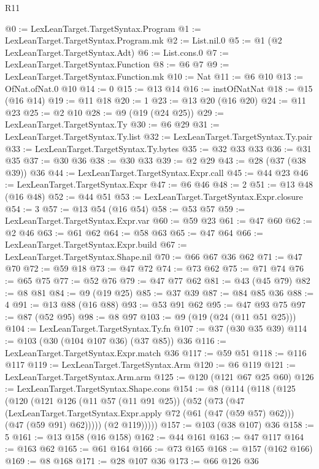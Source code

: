 \begin{lexlean}{R11}
\begin{coremodule}
@0 := LexLeanTarget.TargetSyntax.Program
@1 := LexLeanTarget.TargetSyntax.Program.mk
@2 := List.nil.{0}
@5 := @1 (@2 LexLeanTarget.TargetSyntax.Adt)
@6 := List.cons.{0}
@7 := LexLeanTarget.TargetSyntax.Function
@8 := @6 @7
@9 := LexLeanTarget.TargetSyntax.Function.mk
@10 := Nat
@11 := @6 @10
@13 := OfNat.ofNat.{0} @10
@14 := 0
@15 := @13 @14
@16 := instOfNatNat
@18 := @15 (@16 @14)
@19 := @11 @18
@20 := 1
@23 := @13 @20 (@16 @20)
@24 := @11 @23
@25 := @2 @10
@28 := @9 (@19 (@24 @25))
@29 := LexLeanTarget.TargetSyntax.Ty
@30 := @6 @29
@31 := LexLeanTarget.TargetSyntax.Ty.list
@32 := LexLeanTarget.TargetSyntax.Ty.pair
@33 := LexLeanTarget.TargetSyntax.Ty.bytes
@35 := @32 @33 @33
@36 := @31 @35
@37 := @30 @36
@38 := @30 @33
@39 := @2 @29
@43 := @28 (@37 (@38 @39)) @36
@44 := LexLeanTarget.TargetSyntax.Expr.call
@45 := @44 @23
@46 := LexLeanTarget.TargetSyntax.Expr
@47 := @6 @46
@48 := 2
@51 := @13 @48 (@16 @48)
@52 := @44 @51
@53 := LexLeanTarget.TargetSyntax.Expr.closure
@54 := 3
@57 := @13 @54 (@16 @54)
@58 := @53 @57
@59 := LexLeanTarget.TargetSyntax.Expr.var
@60 := @59 @23
@61 := @47 @60
@62 := @2 @46
@63 := @61 @62
@64 := @58 @63
@65 := @47 @64
@66 := LexLeanTarget.TargetSyntax.Expr.build
@67 := LexLeanTarget.TargetSyntax.Shape.nil
@70 := @66 @67 @36 @62
@71 := @47 @70
@72 := @59 @18
@73 := @47 @72
@74 := @73 @62
@75 := @71 @74
@76 := @65 @75
@77 := @52 @76
@79 := @47 @77 @62
@81 := @43 (@45 @79)
@82 := @8 @81
@84 := @9 (@19 @25)
@85 := @37 @39
@87 := @84 @85 @36
@88 := 4
@91 := @13 @88 (@16 @88)
@93 := @53 @91 @62
@95 := @47 @93 @75
@97 := @87 (@52 @95)
@98 := @8 @97
@103 := @9 (@19 (@24 (@11 @51 @25)))
@104 := LexLeanTarget.TargetSyntax.Ty.fn
@107 := @37 (@30 @35 @39)
@114 := @103 (@30 (@104 @107 @36) (@37 @85)) @36
@116 := LexLeanTarget.TargetSyntax.Expr.match @36
@117 := @59 @51
@118 := @116 @117
@119 := LexLeanTarget.TargetSyntax.Arm
@120 := @6 @119
@121 := LexLeanTarget.TargetSyntax.Arm.arm
@125 := @120 (@121 @67 @25 @60)
@126 := LexLeanTarget.TargetSyntax.Shape.cons
@154 := @8
    (@114
      (@118
        (@125
          (@120
            (@121
              @126
              (@11 @57 (@11 @91 @25))
              (@52
                (@73
                  (@47
                    (LexLeanTarget.TargetSyntax.Expr.apply @72 (@61 (@47 (@59 @57) @62)))
                    (@47 (@59 @91) @62)))))
            (@2 @119)))))
@157 := @103 (@38 @107) @36
@158 := 5
@161 := @13 @158 (@16 @158)
@162 := @44 @161
@163 := @47 @117
@164 := @163 @62
@165 := @61 @164
@166 := @73 @165
@168 := @157 (@162 @166)
@169 := @8 @168
@171 := @28 @107 @36
@173 := @66 @126 @36

\end{coremodule}
\end{lexlean}
